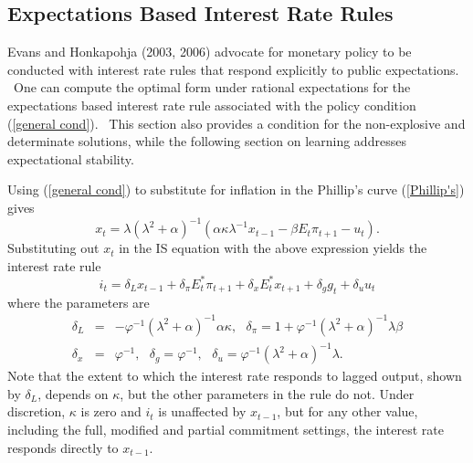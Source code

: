 \documentclass{article}
\begin{document}
\begin{doublespace}
\section{Expectations Based Interest Rate Rules}

Evans and Honkapohja (2003, 2006) advocate for monetary policy to be
conducted with interest rate rules that respond explicitly to public
expectations. \ One can compute the optimal form under rational expectations
for the expectations based interest rate rule associated with the policy
condition (\ref{general cond}). \ This section also provides a condition for
the non-explosive and determinate solutions, while the following section on
learning addresses expectational stability.

Using (\ref{general cond}) to substitute for inflation in the Phillip's
curve (\ref{Phillip's}) gives%
\begin{equation*}
x_{t}=\lambda \left( \lambda ^{2}+\alpha \right) ^{-1}\left( \alpha \kappa 
\lambda ^{-1}x_{t-1}-\beta E_{t}\pi _{t+1}-u_{t}\right) .
\end{equation*}%
Substituting out $x_{t}$ in the IS equation with the above expression yields
the interest rate rule%
\begin{equation}
i_{t}=\delta _{L}x_{t-1}+\delta _{\pi }E_{t}^{\ast }\pi _{t+1}+\delta 
_{x}E_{t}^{\ast }x_{t+1}+\delta _{g}g_{t}+\delta _{u}u_{t}
\label{policy rule}
\end{equation}%
where the parameters are%
\begin{eqnarray*}
\delta _{L} &=&-\varphi ^{-1}\left( \lambda ^{2}+\alpha \right) ^{-1}\alpha
\kappa ,\text{ \ \ }\delta _{\pi }=1+\varphi ^{-1}\left( \lambda ^{2}+\alpha
\right) ^{-1}\lambda \beta \\
\delta _{x} &=&\varphi ^{-1},\text{ \ }\delta _{g}=\varphi ^{-1},\text{ \ \ }%
\delta _{u}=\varphi ^{-1}\left( \lambda ^{2}+\alpha \right) ^{-1}\lambda .
\end{eqnarray*}%
Note that the extent to which the interest rate responds to lagged output,
shown by $\delta _{L}$, depends on $\kappa $, but the other parameters in
the rule do not. Under discretion, $\kappa $ is zero and $i_{t}$ is
unaffected by $x_{t-1}$, but for any other value, including the full,
modified and partial commitment settings, the interest rate responds
directly to $x_{t-1}$. \ 


\end{doublespace}
\end{document}
